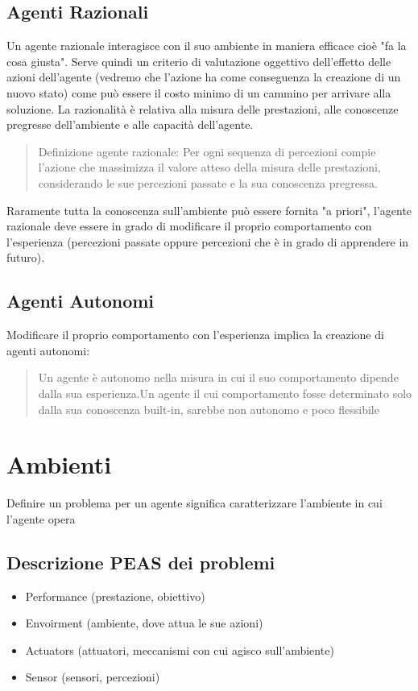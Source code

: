 \documentclass{article}
\begin{document}
\subsection{Agenti Razionali}
Un agente razionale interagisce con il suo ambiente in maniera efficace cioè "fa la cosa giusta". Serve quindi un criterio di valutazione oggettivo dell'effetto delle azioni dell'agente (vedremo che l'azione ha come conseguenza la creazione di un nuovo stato) come può essere il costo minimo di un cammino per arrivare alla soluzione. La razionalità è relativa alla misura delle prestazioni, alle conoscenze pregresse dell'ambiente e alle capacità dell'agente.
\begin{quote}
    Definizione agente razionale: \newline
    Per ogni sequenza di percezioni compie l'azione che massimizza il valore atteso della misura delle prestazioni, considerando le sue percezioni passate e la sua conoscenza pregressa.
\end{quote}
Raramente tutta la conoscenza sull'ambiente può essere fornita "a priori", l'agente razionale deve essere in grado di modificare il proprio comportamento con l'esperienza (percezioni passate oppure percezioni che è in grado di apprendere in futuro). \newline

\subsection{Agenti Autonomi}
Modificare il proprio comportamento con l'esperienza implica la creazione di agenti autonomi:
\begin{quote}
    Un agente è autonomo nella misura in cui il suo comportamento dipende dalla sua esperienza.Un agente il cui comportamento fosse determinato solo dalla sua conoscenza built-in, sarebbe non autonomo e poco flessibile
\end{quote}

\section{Ambienti}
Definire un problema per un agente significa caratterizzare l'ambiente in cui l'agente opera

\subsection{Descrizione PEAS dei problemi}
\begin{itemize}
    \item Performance (prestazione, obiettivo)
    \item Envoirment (ambiente, dove attua le sue azioni)
    \item Actuators (attuatori, meccanismi con cui agisco sull'ambiente)
    \item Sensor (sensori, percezioni)
\end{itemize}
\clearpage
\end{document}
